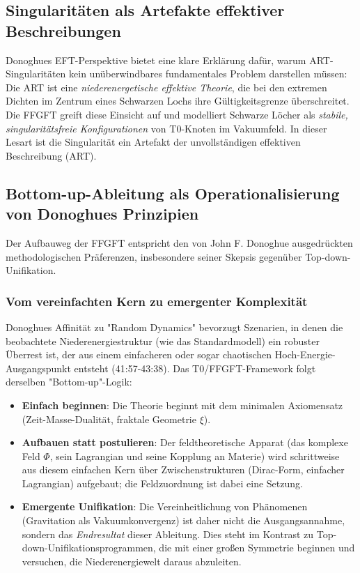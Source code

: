 	\subsection{Singularitäten als Artefakte effektiver Beschreibungen}
	
	Donoghues EFT-Perspektive bietet eine klare Erklärung dafür, warum ART-Singularitäten kein unüberwindbares fundamentales Problem darstellen müssen: Die ART ist eine \emph{niederenergetische effektive Theorie}, die bei den extremen Dichten im Zentrum eines Schwarzen Lochs ihre Gültigkeitsgrenze überschreitet. Die FFGFT greift diese Einsicht auf und modelliert Schwarze Löcher als \emph{stabile, singularitätsfreie Konfigurationen} von T0-Knoten im Vakuumfeld. In dieser Lesart ist die Singularität ein Artefakt der unvollständigen effektiven Beschreibung (ART).
	
	\subsection{Bottom-up-Ableitung als Operationalisierung von Donoghues Prinzipien}
	
	Der Aufbauweg der FFGFT entspricht den von John F. Donoghue ausgedrückten methodologischen Präferenzen, insbesondere seiner Skepsis gegenüber Top-down-Unifikation.
	
	\subsubsection{Vom vereinfachten Kern zu emergenter Komplexität}
	Donoghues Affinität zu "Random Dynamics" bevorzugt Szenarien, in denen die beobachtete Niederenergiestruktur (wie das Standardmodell) ein robuster Überrest ist, der aus einem einfacheren oder sogar chaotischen Hoch-Energie-Ausgangspunkt entsteht \cite{DonoghueInterview2025} (41:57-43:38). Das T0/FFGFT-Framework folgt derselben "Bottom-up"-Logik:
	\begin{itemize}
		\item \textbf{Einfach beginnen}: Die Theorie beginnt mit dem minimalen Axiomensatz (Zeit-Masse-Dualität, fraktale Geometrie \(\xi\)).
		\item \textbf{Aufbauen statt postulieren}: Der feldtheoretische Apparat (das komplexe Feld \(\Phi\), sein Lagrangian und seine Kopplung an Materie) wird schrittweise aus diesem einfachen Kern über Zwischenstrukturen (Dirac-Form, einfacher Lagrangian) aufgebaut; die Feldzuordnung ist dabei eine Setzung.
		\item \textbf{Emergente Unifikation}: Die Vereinheitlichung von Phänomenen (Gravitation als Vakuumkonvergenz) ist daher nicht die Ausgangsannahme, sondern das \emph{Endresultat} dieser Ableitung. Dies steht im Kontrast zu Top-down-Unifikationsprogrammen, die mit einer großen Symmetrie beginnen und versuchen, die Niederenergiewelt daraus abzuleiten.
	\end{itemize}
	

